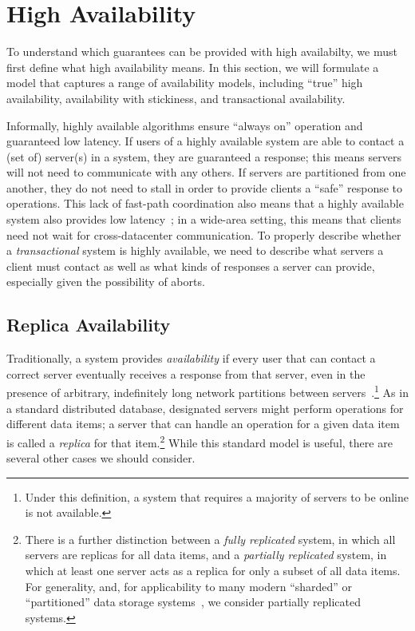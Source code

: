 
\section{High Availability}
\label{sec:availability}

To understand which guarantees can be provided with high availabilty,
we must first define what high availability means. In this section, we
will formulate a model that captures a range of availability models,
including ``true'' high availability, availability with stickiness,
and transactional availability.

Informally, highly available algorithms ensure ``always on'' operation
and guaranteed low latency. If users of a highly available system are
able to contact a (set of) server(s) in a system, they are guaranteed
a response; this means servers will not need to communicate with any
others. If servers are partitioned from one another, they do not need
to stall in order to provide clients a ``safe'' response to
operations. This lack of fast-path coordination also means that a
highly available system also provides low latency~\cite{abadi-pacelc};
in a wide-area setting, this means that clients need not wait for
cross-datacenter communication. To properly describe whether a
\textit{transactional} system is highly available, we need to describe
what servers a client must contact as well as what kinds of responses
a server can provide, especially given the possibility of aborts.

\subsection{Replica Availability}

Traditionally, a system provides {\em availability} if every user that
can contact a correct server eventually receives a response from that
server, even in the presence of arbitrary, indefinitely long network
partitions between servers~\cite{gilbert-cap}.\footnote{Under this
  definition, a system that requires a majority of servers to be
  online is not available.} As in a standard distributed database,
designated servers might perform operations for different data items;
a server that can handle an operation for a given data item is called
a \textit{replica} for that item.\footnote{There is a further
  distinction between a \textit{fully replicated} system, in which all
  servers are replicas for all data items, and a \textit{partially
    replicated} system, in which at least one server acts as a replica
  for only a subset of all data items. For generality, and, for
  applicability to many modern ``sharded'' or ``partitioned'' data
  storage systems~\cite{dynamo, pnuts, bigtable, spanner, hstore}, we
  consider partially replicated systems.} While this standard model is
useful, there are several other cases we should consider.

